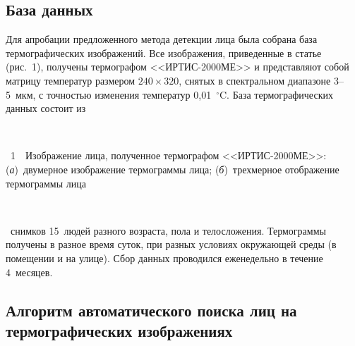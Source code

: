 \begin{multicols}{2}
\subsection{База данных}

  Для апробации предложенного метода детекции лица была собрана база 
термографических изображений. Все изображения, приведенные в статье (рис.~1), 
получены термографом <<ИРТИС-2000МЕ>> и представляют собой матрицу 
температур размером $240\times 320$, снятых в спектральном диапазоне 3--5~мкм, с точностью изменения температур 0,01~$^\circ$C. База 
термографических данных состоит из\linebreak
 \begin{center} %
\vspace*{2pt}
\mbox{%
\epsfxsize=78mm
}
\end{center}
\vspace*{2pt}
{{\figurename~1}\ \ \small{Изображение лица, полученное термографом <<ИРТИС-2000МЕ>>: 
(\textit{а})~двумерное изображение термограммы лица; (\textit{б})~трехмерное отобра\-же\-ние 
термограммы лица}}

\addtocounter{figure}{1}

    \begin{figure*} %
    \vspace*{1pt}
\begin{center}
\mbox{%
\epsfxsize=161.999mm
}
\end{center}
\vspace*{-6pt}
  \end{figure*}
  
~снимков 15~людей разного возраста, 
пола и телосложения. Термограммы получены в разное время суток, при разных 
условиях окружающей среды (в помещении и на улице). Сбор данных проводился 
еженедельно в течение 4~месяцев.


\subsection{Алгоритм автоматического поиска лиц на термографических 
изображениях}
  

\end{multicols}
